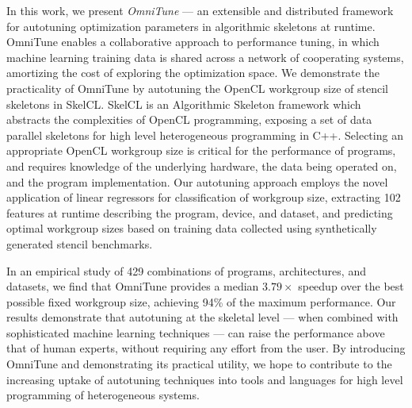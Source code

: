   In this work, we present \textit{OmniTune} --- an extensible and
  distributed framework for autotuning optimization parameters in
  algorithmic skeletons at runtime. OmniTune enables a collaborative
  approach to performance tuning, in which machine learning training
  data is shared across a network of cooperating systems, amortizing the
  cost of exploring the optimization space. We demonstrate the
  practicality of OmniTune by autotuning the OpenCL workgroup size of
  stencil skeletons in SkelCL. SkelCL is an Algorithmic Skeleton
  framework which abstracts the complexities of OpenCL programming,
  exposing a set of data parallel skeletons for high level heterogeneous
  programming in C++. Selecting an appropriate OpenCL workgroup size is
  critical for the performance of programs, and requires knowledge of
  the underlying hardware, the data being operated on, and the program
  implementation. Our autotuning approach employs the novel application
  of linear regressors for classification of workgroup size, extracting
  102 features at runtime describing the program, device, and dataset,
  and predicting optimal workgroup sizes based on training data
  collected using synthetically generated stencil benchmarks.

  In an empirical study of 429 combinations of programs, architectures,
  and datasets, we find that OmniTune provides a median $3.79\times$
  speedup over the best possible fixed workgroup size, achieving 94\% of
  the maximum performance. Our results demonstrate that autotuning at
  the skeletal level --- when combined with sophisticated machine
  learning techniques --- can raise the performance above that of human
  experts, without requiring any effort from the user. By introducing
  OmniTune and demonstrating its practical utility, we hope to
  contribute to the increasing uptake of autotuning techniques into
  tools and languages for high level programming of heterogeneous
  systems.

  \newpage

  

  \newpage

  



